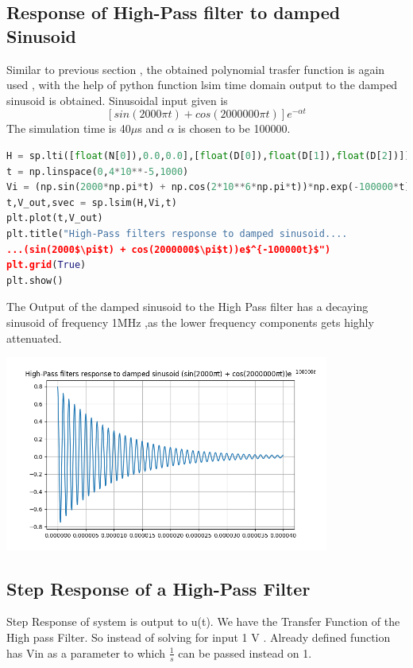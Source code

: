 \documentclass[a4paper]{article}
\begin{document}
\subsection{Response of High-Pass filter to damped Sinusoid}
Similar to previous section , the obtained polynomial trasfer function is again used , with the help of python function lsim time domain output to the damped sinusoid is obtained. Sinusoidal input given is $$[sin(2000 \pi t) + cos(2000000\pi t)]e^{-\alpha t}$$
The simulation time is 40$\mu$s and $\alpha$ is chosen to be 100000.
\begin{lstlisting}[language=Python]
H = sp.lti([float(N[0]),0.0,0.0],[float(D[0]),float(D[1]),float(D[2])])
t = np.linspace(0,4*10**-5,1000)
Vi = (np.sin(2000*np.pi*t) + np.cos(2*10**6*np.pi*t))*np.exp(-100000*t)
t,V_out,svec = sp.lsim(H,Vi,t)
plt.plot(t,V_out)
plt.title("High-Pass filters response to damped sinusoid....
...(sin(2000$\pi$t) + cos(2000000$\pi$t))e$^{-100000t}$") 
plt.grid(True)
plt.show()
\end{lstlisting}
The Output of the damped sinusoid to the High Pass filter has a decaying sinusoid of frequency 1MHz ,as the lower frequency components gets highly attenuated.
\begin{center}
\includegraphics[width=0.8\textwidth]{Figure_5.png}
\end{center}
\subsection{Step Response of a High-Pass Filter}
Step Response of system is output to u(t). We have the Transfer Function of the High pass Filter. So instead of solving for input 1 V . Already defined function has Vin as a parameter to which $\frac{1}{s}$ can be passed instead on 1.   
\end{document}
